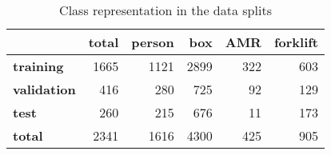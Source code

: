 \begin{table}[htbp]
\centering
\caption{Class representation in the data splits}
\label{tab:class_representation}
\begin{tabular}{lrrrrr}
\toprule
 & \bfseries total & \bfseries person & \bfseries box & \bfseries AMR & \bfseries forklift \\
\midrule
\bfseries training & 1665 & 1121 & 2899 & 322 & 603 \\
\bfseries validation & 416 & 280 & 725 & 92 & 129 \\
\bfseries test & 260 & 215 & 676 & 11 & 173 \\
\bfseries total & 2341 & 1616 & 4300 & 425 & 905 \\
\bottomrule
\end{tabular}
\end{table}
